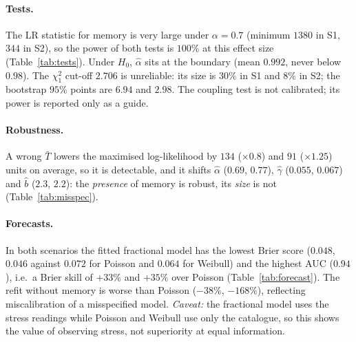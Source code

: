 \documentclass[10pt,a4paper]{article}
\newcommand{\Tb}{\bar T}
\newcommand{\tabdir}{v1tabs}   %
\begin{document}
\begin{table}[t]
\centering\scriptsize

\caption{Recovery of $(\alpha,\gamma,c,b)$ over valid replicates ($19/24$ in S1, $9/16$ in S2).}\label{tab:recovery}
\end{table}

\paragraph{Tests.} The LR statistic for memory is very large under $\alpha=0.7$ (minimum $1380$ in S1, $344$ in S2), so the power of both tests is $100\%$ at this effect size (Table~\ref{tab:tests}). Under $H_0$, $\hat\alpha$ sits at the boundary (mean $0.992$, never below $0.98$). The $\chi^2_1$ cut-off $2.706$ is unreliable: its size is $30\%$ in S1 and $8\%$ in S2; the bootstrap $95\%$ points are $6.94$ and $2.98$. The coupling test is not calibrated; its power is reported only as a guide.

\begin{table}[t]
\centering\scriptsize

\caption{Tests of memory and coupling. Type I: rejection rate of the $\chi^2_1$ cut-off under $H_0:\alpha=1$ ($B_0$ null datasets); crit.: bootstrap $95\%$ point; power over valid replicates.}\label{tab:tests}
\end{table}


\paragraph{Robustness.} A wrong $\Tb$ lowers the maximised log-likelihood by $134$ ($\times0.8$) and $91$ ($\times1.25$) units on average, so it is detectable, and it shifts $\hat\alpha$ ($0.69$, $0.77$), $\hat\gamma$ ($0.055$, $0.067$) and $\hat b$ ($2.3$, $2.2$): the \emph{presence} of memory is robust, its \emph{size} is not (Table~\ref{tab:misspec}).
\begin{table}[t]
\centering\scriptsize

\caption{Fits with a wrong reference recurrence time (12 S1 datasets; truth $0.7$, $0.08$, $10$, $3$). Loss: drop of the maximised log-likelihood.}\label{tab:misspec}
\end{table}

\paragraph{Forecasts.} In both scenarios the fitted fractional model has the lowest Brier score ($0.048$, $0.046$ against $0.072$ for Poisson and $0.064$ for Weibull) and the highest AUC ($0.94$), i.e.\ a Brier skill of $+33\%$ and $+35\%$ over Poisson (Table~\ref{tab:forecast}). The refit without memory is worse than Poisson ($-38\%$, $-168\%$), reflecting miscalibration of a misspecified model. \emph{Caveat:} the fractional model uses the stress readings while Poisson and Weibull use only the catalogue, so this shows the value of observing stress, not superiority at equal information.
\end{document}
